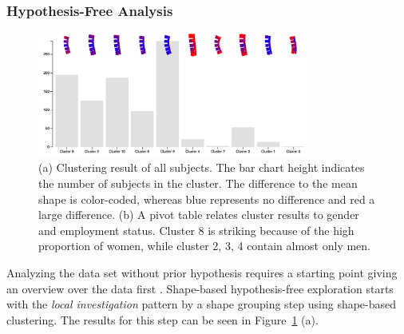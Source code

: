 \documentclass[journal]{style/vgtc} 			          %
\begin{document}
\subsubsection{Hypothesis-Free Analysis} \label{Hypothesis free Analysis}
\begin{figure}[htb]
 \centering
 \includegraphics[width=3.5in]{figures/hypothesisfree}
 \caption{(a) Clustering result of all subjects. The bar chart height indicates the number of subjects in the cluster. The difference to the mean shape is color-coded, whereas blue represents no difference and red a large difference. (b) A pivot table relates cluster results to gender and employment status. Cluster 8 is striking because of the high proportion of women, while cluster 2, 3, 4 contain almost only men.}
 \label{fig:hypothesisfree}
\end{figure}
%
Analyzing the data set without prior hypothesis requires a starting point giving an overview over the data first \cite{Shneiderman1996}.
%
Shape-based hypothesis-free exploration starts with the \emph{local investigation} pattern by a shape grouping step using shape-based clustering.
%
The results for this step can be seen in Figure~\ref{fig:hypothesisfree} (a).
\end{document}
